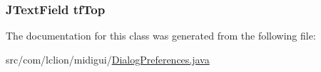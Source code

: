 \hypertarget{classcom_1_1lclion_1_1midigui_1_1_dialog_preferences_a1df6442c69813ef29777fef773a4c0f9}{
\subsubsection[{tf\+Top}]{\setlength{\rightskip}{0pt plus 5cm}J\+Text\+Field tf\+Top\hspace{0.3cm}{\ttfamily [private]}}}\label{classcom_1_1lclion_1_1midigui_1_1_dialog_preferences_a1df6442c69813ef29777fef773a4c0f9}


The documentation for this class was generated from the following file\+:\begin{DoxyCompactItemize}
\item 
src/com/lclion/midigui/\hyperlink{_dialog_preferences_8java}{Dialog\+Preferences.\+java}\end{DoxyCompactItemize}
